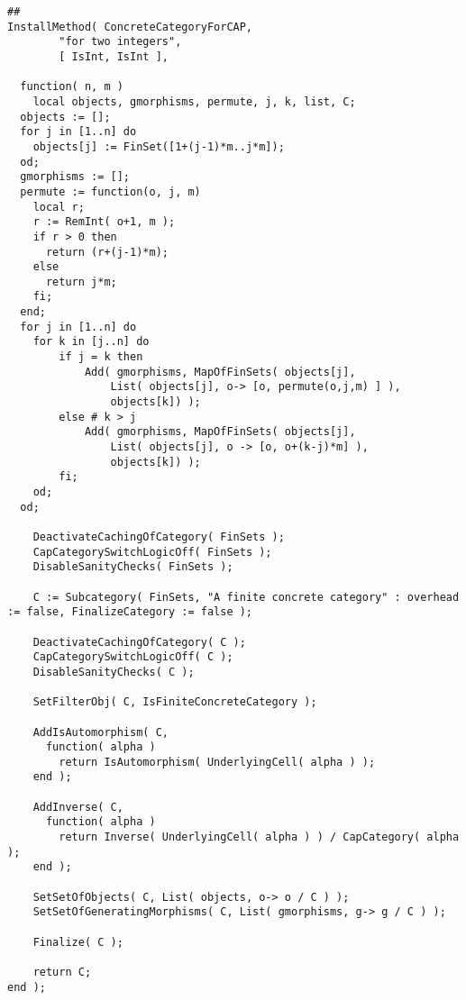 \begin{verbatim}
##
InstallMethod( ConcreteCategoryForCAP,
        "for two integers",
        [ IsInt, IsInt ],
        
  function( n, m )
	local objects, gmorphisms, permute, j, k, list, C;
  objects := [];
  for j in [1..n] do
    objects[j] := FinSet([1+(j-1)*m..j*m]);
  od;
  gmorphisms := [];
  permute := function(o, j, m)
    local r;
    r := RemInt( o+1, m );
    if r > 0 then
      return (r+(j-1)*m);
    else
      return j*m;
    fi;
  end;
  for j in [1..n] do
    for k in [j..n] do
		if j = k then
		    Add( gmorphisms, MapOfFinSets( objects[j], 
				List( objects[j], o-> [o, permute(o,j,m) ] ),
				objects[k]) );
		else # k > j
			Add( gmorphisms, MapOfFinSets( objects[j],
				List( objects[j], o -> [o, o+(k-j)*m] ),
				objects[k]) );
		fi;
	od;
  od;
  
    DeactivateCachingOfCategory( FinSets );
    CapCategorySwitchLogicOff( FinSets );
    DisableSanityChecks( FinSets );
    
    C := Subcategory( FinSets, "A finite concrete category" : overhead := false, FinalizeCategory := false );
	
	DeactivateCachingOfCategory( C );
    CapCategorySwitchLogicOff( C );
    DisableSanityChecks( C );
	
	SetFilterObj( C, IsFiniteConcreteCategory );
	
	AddIsAutomorphism( C,
      function( alpha )
        return IsAutomorphism( UnderlyingCell( alpha ) );
    end );
	
	AddInverse( C,
      function( alpha )
        return Inverse( UnderlyingCell( alpha ) ) / CapCategory( alpha );
    end );
	
	SetSetOfObjects( C, List( objects, o-> o / C ) );
	SetSetOfGeneratingMorphisms( C, List( gmorphisms, g-> g / C ) );
	
    Finalize( C );
    
    return C;
end );
\end{verbatim}